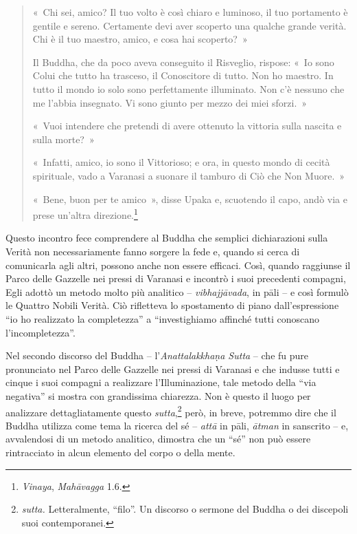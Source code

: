 \begin{quote}
«~Chi sei, amico? Il tuo volto è così chiaro e luminoso, il tuo
portamento è gentile e sereno. Certamente devi aver scoperto una qualche
grande verità. Chi è il tuo maestro, amico, e cosa hai scoperto?~»

Il Buddha, che da poco aveva conseguito il Risveglio, rispose: «~Io sono
Colui che tutto ha trasceso, il Conoscitore di tutto. Non ho maestro. In
tutto il mondo io solo sono perfettamente illuminato. Non c'è nessuno
che me l'abbia insegnato. Vi sono giunto per mezzo dei miei sforzi.~»

«~Vuoi intendere che pretendi di avere ottenuto la vittoria sulla
nascita e sulla morte?~»

«~Infatti, amico, io sono il Vittorioso; e ora, in questo mondo di
cecità spirituale, vado a Varanasi a suonare il tamburo di Ciò che Non
Muore.~»

«~Bene, buon per te amico~», disse Upaka e, scuotendo il capo, andò via e
prese un'altra direzione.\footnote{\emph{Vinaya}, \emph{Mahāvagga} 1.6.}
\end{quote}

Questo incontro fece comprendere al Buddha che semplici dichiarazioni
sulla Verità non necessariamente fanno sorgere la fede e, quando si
cerca di comunicarla agli altri, possono anche non essere efficaci.
Così, quando raggiunse il Parco delle Gazzelle nei pressi di Varanasi e
incontrò i suoi precedenti compagni, Egli adottò un metodo molto più
analitico -- \emph{vibhajjāvada}, in pāli -- e così formulò le Quattro
Nobili Verità. Ciò rifletteva lo spostamento di piano dall'espressione
``io ho realizzato la completezza'' a ``investighiamo affinché tutti
conoscano l'incompletezza''.

Nel secondo discorso del Buddha -- l'\emph{Anattalakkhaṇa Sutta} -- che
fu pure pronunciato nel Parco delle Gazzelle nei pressi di Varanasi e
che indusse tutti e cinque i suoi compagni a realizzare l'Illuminazione,
tale metodo della ``via negativa'' si mostra con grandissima chiarezza.
Non è questo il luogo per analizzare dettagliatamente questo
\emph{sutta},\footnote{\emph{sutta.} Letteralmente, ``filo''. Un
  discorso o sermone del Buddha o dei discepoli suoi contemporanei.}
però, in breve, potremmo dire che il Buddha utilizza come tema la
ricerca del sé -- \emph{attā} in pāli, \emph{ātman} in sanscrito -- e,
avvalendosi di un metodo analitico, dimostra che un ``sé'' non può
essere rintracciato in alcun elemento del corpo o della mente.

